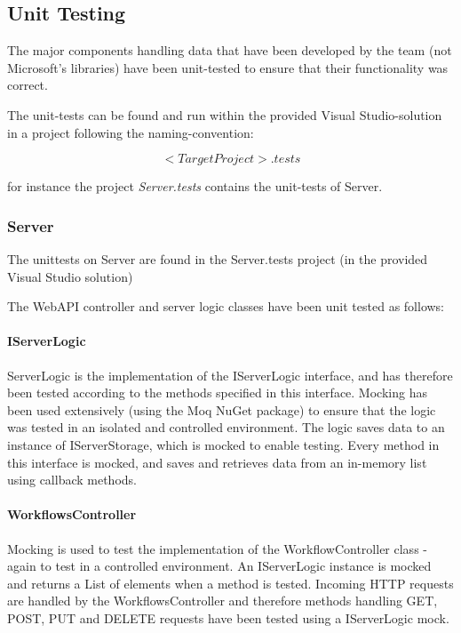 \subsection{Unit Testing}\label{unit-testing}

The major components handling data that have been developed by the team
(not Microsoft's libraries) have been unit-tested to ensure that their
functionality was correct.

The unit-tests can be found and run within the provided Visual
Studio-solution in a project following the naming-convention:

\[<TargetProject>.tests\]

for instance the project \emph{Server.tests} contains the unit-tests of
Server.

\subsubsection{Server}\label{server}

The unittests on Server are found in the Server.tests project (in the
provided Visual Studio solution)

The WebAPI controller and server logic classes have been unit tested as
follows:

\paragraph{IServerLogic}\label{iserverlogic}

ServerLogic is the implementation of the IServerLogic interface, and has
therefore been tested according to the methods specified in this
interface. Mocking has been used extensively (using the Moq NuGet
package) to ensure that the logic was tested in an isolated and
controlled environment. The logic saves data to an instance of
IServerStorage, which is mocked to enable testing. Every method in this
interface is mocked, and saves and retrieves data from an in-memory list
using callback methods.

\paragraph{WorkflowsController}\label{workflowscontroller}

Mocking is used to test the implementation of the WorkflowController
class - again to test in a controlled environment. An IServerLogic
instance is mocked and returns a List of elements when a method is
tested. Incoming HTTP requests are handled by the WorkflowsController
and therefore methods handling GET, POST, PUT and DELETE requests have
been tested using a IServerLogic mock.

